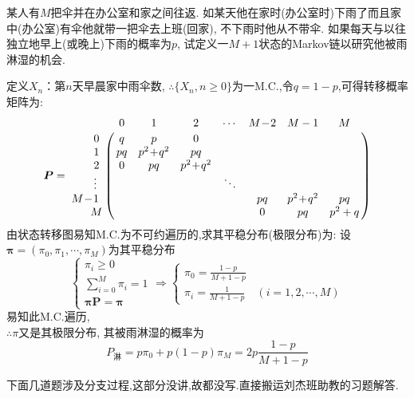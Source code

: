 \begin{problem}{3.19}
某人有$M$把伞并在办公室和家之间往返. 如某天他在家时(办公室时)下雨了而且家中(办公室)有伞他就带一把伞去上班(回家), 不下雨时他从不带伞. 如果每天与以往独立地早上(或晚上)下雨的概率为$p$, 试定义一$M+1$状态的Markov链以研究他被雨淋湿的机会.
\end{problem}
\begin{solution}
	定义$X_n$：第$n$天早晨家中雨伞数, $\therefore \{X_n, n \geqslant 0\}$为一M.C.,令$q=1-p$,可得转移概率矩阵为:
	\[
		\bm{P} =
		\bordermatrix{
			~ & 0 & 1 & 2 & \cdots & M\!-\!2 & M-1 & M \cr
			\qquad 0 & q & p & 0 & ~ & ~ & ~ & ~\cr
			\qquad 1 & pq & p^2\!+\!q^2 & pq & ~ & ~ & ~ & ~\cr
			\qquad 2 & 0 & pq & p^2\!+\!q^2 & ~ & ~ & ~ & ~\cr
			\qquad \vdots & ~ & ~ & ~ & \ddots & ~ & ~ & ~\cr
			M\!-\!1 & ~ & ~ & ~ & ~ & pq & p^2\!+\!q^2 & pq\cr
			\hspace{0.6cm} M & ~ & ~ & ~ & ~ & 0 & pq & p^2+q\cr}
	\]
	由状态转移图易知M.C.为不可约遍历的,求其平稳分布(极限分布)为:
	设$\bm{\pi}= (\pi_0, \pi_1, \cdots, \pi_M)$为其平稳分布
	\[
		\begin{cases}
			\pi_i \geqslant 0            \\
			\sum\limits^M_{i=0}\pi_i = 1 \\
			\bm{\pi}\bm{P} = \bm{\pi}
		\end{cases} \Rightarrow
		\begin{cases}
			\displaystyle \pi_0 = \frac{1-p}{M+1-p} \\
			\displaystyle \pi_i = \frac{1}{M+1-p} \quad (i = 1,2,\cdots,M)
		\end{cases}
	\]
	易知此M.C.遍历, \\
	$\therefore \pi$又是其极限分布, 其被雨淋湿的概率为
	\[
		P_{\text{淋}} = p\pi_0+p(1-p)\pi_M = 2p\frac{1-p}{M+1-p}
	\]
\end{solution}

下面几道题涉及分支过程,这部分没讲,故都没写.直接搬运刘杰班助教的习题解答\cite{刘杰班助教}.

